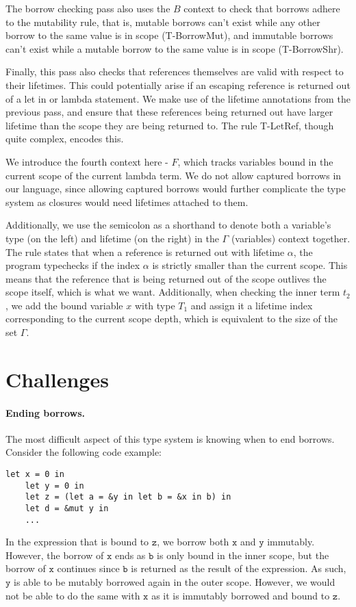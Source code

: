 \documentclass[letterpaper,11pt]{article}
\begin{document}
The borrow checking pass also uses the $B$ context to check that borrows adhere to
the mutability rule, that is, mutable borrows can't exist while any other borrow
to the same value is in scope (T-BorrowMut), and immutable borrows can't exist while a mutable
borrow to the same value is in scope (T-BorrowShr).

Finally, this pass also checks that references themselves are valid with respect
to their lifetimes. This could potentially arise if an escaping reference is returned
out of a let in or lambda statement. We make use of the lifetime annotations from
the previous pass, and ensure that these references being returned out have
larger lifetime than the scope they are being returned to. The rule T-LetRef,
though quite complex, encodes this.

We introduce the fourth context here - $F$, which tracks variables bound in the current
scope of the current lambda term. We do not allow captured borrows in our language, since allowing captured borrows 
would further complicate the type system as closures would need lifetimes attached to them.

Additionally, we use the semicolon as a shorthand to denote both a variable's type (on the left) and lifetime (on the right) in
the $\Gamma$ (variables) context together. The rule states that
when a reference is returned out with lifetime $\alpha$, the program typechecks
if the index $\alpha$ is strictly smaller than the current scope. This means that the reference that is being returned out of
the scope outlives the scope itself, which is what we want. Additionally, when checking
the inner term $t_2$, we add the bound variable $x$ with type $T_1$ and assign it a lifetime index
corresponding to the current scope depth, which is equivalent to the size of the set $\Gamma$.

\section{Challenges}

\paragraph{Ending borrows.}
The most difficult aspect of this type system is knowing when to end borrows. Consider the following code example:
\begin{lstlisting}[language=caml]
    let x = 0 in 
    let y = 0 in 
    let z = (let a = &y in let b = &x in b) in 
    let d = &mut y in 
    ...
\end{lstlisting}
In the expression that is bound to $\mathtt{z}$, we borrow both $\mathtt{x}$ and $\mathtt{y}$ immutably.
However, the borrow of $\mathtt{x}$ ends as $\mathtt{b}$ is only bound in the inner scope, 
but the borrow of $\mathtt{x}$ continues since $\mathtt{b}$ is returned as the result of the expression.
As such, $\mathtt{y}$ is able to be mutably borrowed again in the outer scope. However, we would not be 
able to do the same with $\mathtt{x}$ as it is immutably borrowed and bound to $\mathtt{z}$.
\end{document}
